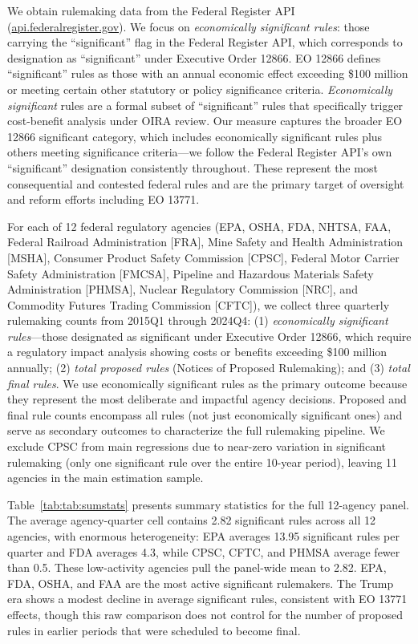 \documentclass[12pt]{article}
\begin{document}
We obtain rulemaking data from the Federal Register API (\url{api.federalregister.gov}). We focus on \emph{economically significant rules}: those carrying the ``significant'' flag in the Federal Register API, which corresponds to designation as ``significant'' under Executive Order 12866. EO 12866 defines ``significant'' rules as those with an annual economic effect exceeding \$100 million or meeting certain other statutory or policy significance criteria. \emph{Economically significant} rules are a formal subset of ``significant'' rules that specifically trigger cost-benefit analysis under OIRA review. Our measure captures the broader EO 12866 significant category, which includes economically significant rules plus others meeting significance criteria---we follow the Federal Register API's own ``significant'' designation consistently throughout. These represent the most consequential and contested federal rules and are the primary target of oversight and reform efforts including EO 13771.

For each of 12 federal regulatory agencies (EPA, OSHA, FDA, NHTSA, FAA, Federal Railroad Administration [FRA], Mine Safety and Health Administration [MSHA], Consumer Product Safety Commission [CPSC], Federal Motor Carrier Safety Administration [FMCSA], Pipeline and Hazardous Materials Safety Administration [PHMSA], Nuclear Regulatory Commission [NRC], and Commodity Futures Trading Commission [CFTC]), we collect three quarterly rulemaking counts from 2015Q1 through 2024Q4: (1) \emph{economically significant rules}---those designated as significant under Executive Order 12866, which require a regulatory impact analysis showing costs or benefits exceeding \$100 million annually; (2) \emph{total proposed rules} (Notices of Proposed Rulemaking); and (3) \emph{total final rules}. We use economically significant rules as the primary outcome because they represent the most deliberate and impactful agency decisions. Proposed and final rule counts encompass all rules (not just economically significant ones) and serve as secondary outcomes to characterize the full rulemaking pipeline. We exclude CPSC from main regressions due to near-zero variation in significant rulemaking (only one significant rule over the entire 10-year period), leaving 11 agencies in the main estimation sample.

Table~\ref{tab:tab:sumstats} presents summary statistics for the full 12-agency panel. The average agency-quarter cell contains 2.82 significant rules across all 12 agencies, with enormous heterogeneity: EPA averages 13.95 significant rules per quarter and FDA averages 4.3, while CPSC, CFTC, and PHMSA average fewer than 0.5. These low-activity agencies pull the panel-wide mean to 2.82. EPA, FDA, OSHA, and FAA are the most active significant rulemakers. The Trump era shows a modest decline in average significant rules, consistent with EO 13771 effects, though this raw comparison does not control for the number of proposed rules in earlier periods that were scheduled to become final.
\end{document}
